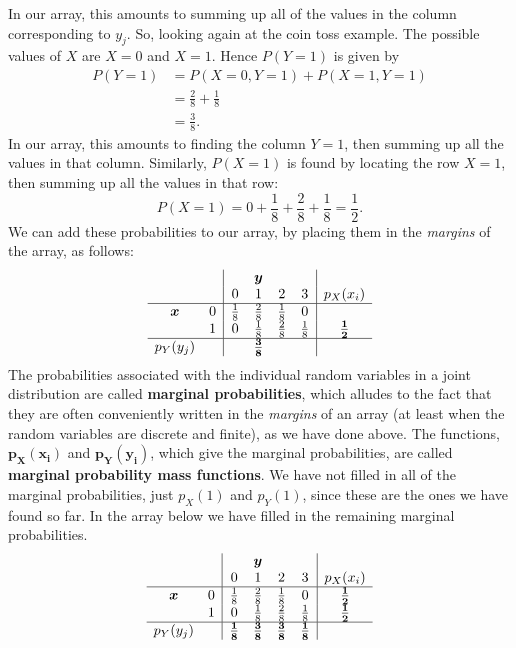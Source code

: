 \noindent In our array, this amounts to summing up all of the values in the column corresponding to $y_j$. So, looking again at the coin toss example. The possible values of $X$ are $X=0$ and $X=1$. Hence $P(Y = 1)$ is given by
\begin{align*}
P(Y = 1) & = P(X = 0,Y=1) + P(X = 1,Y=1) \\
	& = \frac{2}{8} + \frac{1}{8} \\
	& = \frac{3}{8}.
\end{align*}
In our array, this amounts to finding the column $Y = 1$, then summing up all the values in that column. Similarly, $P(X = 1)$ is found by locating the row $X = 1$, then summing up all the values in that row:
\[
P(X = 1) = 0 + \frac{1}{8} + \frac{2}{8} + \frac{1}{8} = \frac{1}{2}.
\]
We can add these probabilities to our array, by placing them in the \textit{margins} of the array, as follows:
\[
\begin{array}{cc|cccc|c} 
&& \multicolumn{3}{c}{\boldsymbol{y}} & \\
&& \multicolumn{1}{c}{0} &  \multicolumn{1}{c}{1} &  \multicolumn{1}{c}{2} &  3 & p_X(x_i) \\ \hline

$$\boldsymbol{x}$$ \multirow{3}{*}{$$} &0& \frac{1}{8} & \frac{2}{8} & \frac{1}{8} & 0 & \\ 
				 &1&  0                 & \frac{1}{8} & \frac{2}{8} & \frac{1}{8} & \boldsymbol{\frac{1}{2}} \\ \hline
\multicolumn{1}{c}{p_Y(y_j)} &&&\boldsymbol{\frac{3}{8}}&&
\end{array}
\]
The probabilities associated with the individual random variables in a joint distribution are called \textbf{marginal probabilities}, which alludes to the fact that they are often conveniently written in the \textit{margins} of an array (at least when the random variables are discrete and finite), as we have done above. The functions, $\boldsymbol{p_X(x_i)}$ and $\boldsymbol{p_Y(y_i)}$, which give the marginal probabilities, are called \textbf{marginal probability mass functions}. We have not filled in all of the marginal probabilities, just $p_X(1)$ and $p_Y(1)$, since these are the ones we have found so far. In the array below we have filled in the remaining marginal probabilities.
\[
\begin{array}{cc|cccc|c} 
&& \multicolumn{3}{c}{\boldsymbol{y}} & \\
&& \multicolumn{1}{c}{0} &  \multicolumn{1}{c}{1} &  \multicolumn{1}{c}{2} &  3 & p_X(x_i) \\ \hline

$$\boldsymbol{x}$$ \multirow{3}{*}{$$} &0& \frac{1}{8} & \frac{2}{8} & \frac{1}{8} & 0 &\boldsymbol{\frac{1}{2}}  \\ 
	                        &1&  0                 & \frac{1}{8} & \frac{2}{8} & \frac{1}{8} & \boldsymbol{\frac{1}{2}} \\ \hline
\multicolumn{1}{c}{p_Y(y_j)} &&\boldsymbol{\frac{1}{8}}&\boldsymbol{\frac{3}{8}}&\boldsymbol{\frac{3}{8}}&\boldsymbol{\frac{1}{8}}
\end{array}
\]
